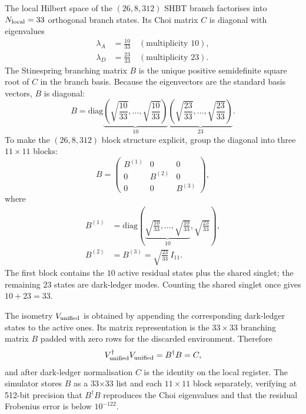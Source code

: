 \documentclass[aps,pra,10pt,onecolumn,superscriptaddress,nofootinbib,longbibliography,floatfix]{revtex4-2}
\begin{document}
The local Hilbert space of the $(26,8,312)$ SHBT branch factorises into $N_{\rm local}=33$ orthogonal branch states.  Its Choi matrix $C$ is diagonal with eigenvalues
%
\begin{align}
\lambda_A &= \frac{10}{33} \quad (\text{multiplicity } 10), \\
\lambda_D &= \frac{23}{33} \quad (\text{multiplicity } 23) .
\end{align}
%
The Stinespring branching matrix $B$ is the unique positive semidefinite square root of $C$ in the branch basis.  Because the eigenvectors are the standard basis vectors, $B$ is diagonal:
%
\begin{equation}
\label{eq:full-branching-matrix}
B = \mathrm{diag}\!
\underbrace{\left(\sqrt{\frac{10}{33}},\dots,\sqrt{\frac{10}{33}}\right)}_{10}
\underbrace{\left(\sqrt{\frac{23}{33}},\dots,\sqrt{\frac{23}{33}}\right)}_{23} .
\end{equation}
%
To make the $(26,8,312)$ block structure explicit, group the diagonal into three $11\times 11$ blocks:
%
\begin{equation}
B = \begin{pmatrix}
B^{(1)} & 0 & 0 \\
0 & B^{(2)} & 0 \\
0 & 0 & B^{(3)}
\end{pmatrix},
\end{equation}
%
where
%
\begin{align}
B^{(1)} &= \mathrm{diag}\!\left(
  \underbrace{\sqrt{\frac{10}{33}},\dots,\sqrt{\frac{10}{33}}}_{10},
  \sqrt{\frac{23}{33}}
\right), \\
B^{(2)} &= B^{(3)} = \sqrt{\frac{23}{33}}\, I_{11} .
\end{align}
%
The first block contains the $10$ active residual states plus the shared singlet; the remaining $23$ states are dark-ledger modes.  Counting the shared singlet once gives $10+23=33$.

The isometry $V_{\rm unified}$ is obtained by appending the corresponding dark-ledger states to the active ones.  Its matrix representation is the $33\times 33$ branching matrix $B$ padded with zero rows for the discarded environment.  Therefore
%
\begin{equation}
V_{\rm unified}^\dagger V_{\rm unified}^{} = B^{\dagger} B = C ,
\end{equation}
%
and after dark-ledger normalisation $C$ is the identity on the local register.  The simulator stores $B$ as a 33$\times$33 list and each $11\times 11$ block separately, verifying at 512-bit precision that $B^{\dagger}B$ reproduces the Choi eigenvalues and that the residual Frobenius error is below $10^{-122}$.
\end{document}
